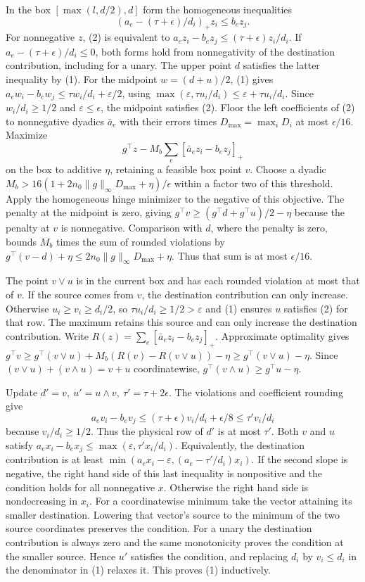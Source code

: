 \documentclass[11pt]{article}
\begin{document}
In the box \([\max(l,d/2),d]\) form the homogeneous inequalities
\[
                   (a_e-(\tau+\epsilon)/d_i)_+ z_i\le b_e z_j .       \tag{2}
\]
For nonnegative \(z\), (2) is equivalent to \(a_e z_i-b_e z_j\le(\tau+\epsilon)z_i/d_i\). If \(a_e-(\tau+\epsilon)/d_i\le0\), both forms hold from nonnegativity of the destination contribution, including for a unary. The upper point \(d\) satisfies the latter inequality by (1). For the midpoint \(w=(d+u)/2\), (1) gives \(a_e w_i-b_e w_j\le\tau w_i/d_i+\varepsilon/2\), using \(\max(\varepsilon,\tau u_i/d_i)\le\varepsilon+\tau u_i/d_i\). Since \(w_i/d_i\ge1/2\) and \(\varepsilon\le\epsilon\), the midpoint satisfies (2). Floor the left coefficients of (2) to nonnegative dyadics \(\bar a_e\) with their errors times \(D_{\max}=\max_i D_i\) at most \(\epsilon/16\). Maximize
\[
         g^\top z-M_b\sum_e[\bar a_e z_i-b_e z_j]_+
\]
on the box to additive \(\eta\), retaining a feasible box point \(v\). Choose a dyadic \(M_b>16(1+2n_0\|g\|_\infty D_{\max}+\eta)/\epsilon\) within a factor two of this threshold. Apply the homogeneous hinge minimizer to the negative of this objective. The penalty at the midpoint is zero, giving \(g^\top v\ge(g^\top d+g^\top u)/2-\eta\) because the penalty at \(v\) is nonnegative. Comparison with \(d\), where the penalty is zero, bounds \(M_b\) times the sum of rounded violations by \(g^\top(v-d)+\eta\le2n_0\|g\|_\infty D_{\max}+\eta\). Thus that sum is at most \(\epsilon/16\).

The point \(v\vee u\) is in the current box and has each rounded violation at most that of \(v\). If the source comes from \(v\), the destination contribution can only increase. Otherwise \(u_i\ge v_i\ge d_i/2\), so \(\tau u_i/d_i\ge1/2>\varepsilon\) and (1) ensures \(u\) satisfies (2) for that row. The maximum retains this source and can only increase the destination contribution. Write \(R(z)=\sum_e[\bar a_e z_i-b_e z_j]_+\). Approximate optimality gives \(g^\top v\ge g^\top(v\vee u)+M_b(R(v)-R(v\vee u))-\eta\ge g^\top(v\vee u)-\eta\). Since \((v\vee u)+(v\wedge u)=v+u\) coordinatewise, \(g^\top(v\wedge u)\ge g^\top u-\eta\).

Update \(d'=v,\ u'=u\wedge v,\ \tau'=\tau+2\epsilon\). The violations and coefficient rounding give
\[
 a_e v_i-b_e v_j\le(\tau+\epsilon)v_i/d_i+\epsilon/8\le \tau'v_i/d_i
\]
because \(v_i/d_i\ge1/2\). Thus the physical row of \(d'\) is at most \(\tau'\). Both \(v\) and \(u\) satisfy \(a_e x_i-b_e x_j\le\max(\varepsilon,\tau' x_i/d_i)\). Equivalently, the destination contribution is at least \(\min(a_e x_i-\varepsilon,(a_e-\tau'/d_i)x_i)\). If the second slope is negative, the right hand side of this last inequality is nonpositive and the condition holds for all nonnegative \(x\). Otherwise the right hand side is nondecreasing in \(x_i\). For a coordinatewise minimum take the vector attaining its smaller destination. Lowering that vector's source to the minimum of the two source coordinates preserves the condition. For a unary the destination contribution is always zero and the same monotonicity proves the condition at the smaller source. Hence \(u'\) satisfies the condition, and replacing \(d_i\) by \(v_i\le d_i\) in the denominator in (1) relaxes it. This proves (1) inductively.
\end{document}
